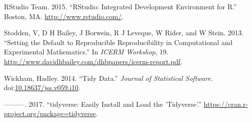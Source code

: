 \documentclass[11pt,preprint, authoryear]{elsarticle}
\numberwithin{equation}{section}
\numberwithin{figure}{section}
\numberwithin{table}{section}
\begin{document}
\hypertarget{ref-RStudioTeam2015}{}
RStudio Team. 2015. ``RStudio: Integrated Development Environment for
R.'' Boston, MA. \url{http://www.rstudio.com/}.

\hypertarget{ref-Stodden2013}{}
Stodden, V, D H Bailey, J Borwein, R J Leveque, W Rider, and W Stein.
2013. ``Setting the Default to Reproducible Reproducibility in
Computational and Experimental Mathematics.'' In \emph{ICERM Workshop},
19. \url{http://www.davidhbailey.com/dhbpapers/icerm-report.pdf}.

\hypertarget{ref-Wickham2014}{}
Wickham, Hadley. 2014. ``Tidy Data.'' \emph{Journal of Statistical
Software}.
doi:\href{https://doi.org/10.18637/jss.v059.i10}{10.18637/jss.v059.i10}.

\hypertarget{ref-Wickham2017}{}
---------. 2017. ``tidyverse: Easily Install and Load the 'Tidyverse'.''
\url{https://cran.r-project.org/package=tidyverse}.




\end{document}
